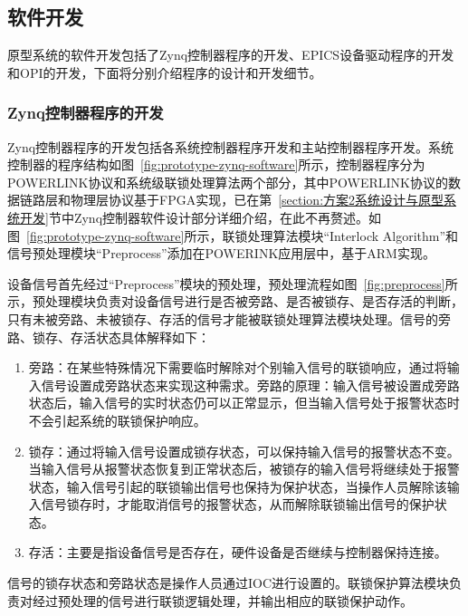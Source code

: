 \subsection{软件开发}

原型系统的软件开发包括了Zynq控制器程序的开发、EPICS设备驱动程序的开发和OPI的开发，下面将分别介绍程序的设计和开发细节。

\subsubsection{Zynq控制器程序的开发}

Zynq控制器程序的开发包括各系统控制器程序开发和主站控制器程序开发。系统控制器的程序结构如图~\ref{fig:prototype-zynq-software}所示，控制器程序分为POWERLINK协议和系统级联锁处理算法两个部分，其中POWERLINK协议的数据链路层和物理层协议基于FPGA实现，已在第~\ref{section:方案2系统设计与原型系统开发}节中Zynq控制器软件设计部分详细介绍，在此不再赘述。如图~\ref{fig:prototype-zynq-software}所示，联锁处理算法模块“Interlock Algorithm”和信号预处理模块“Preprocess”添加在POWERINK应用层中，基于ARM实现。

设备信号首先经过“Preprocess”模块的预处理，预处理流程如图~\ref{fig:preprocess}所示，预处理模块负责对设备信号进行是否被旁路、是否被锁存、是否存活的判断，只有未被旁路、未被锁存、存活的信号才能被联锁处理算法模块处理。信号的旁路、锁存、存活状态具体解释如下：

\begin{enumerate}
  \item 旁路：在某些特殊情况下需要临时解除对个别输入信号的联锁响应，通过将输入信号设置成旁路状态来实现这种需求。旁路的原理：输入信号被设置成旁路状态后，输入信号的实时状态仍可以正常显示，但当输入信号处于报警状态时不会引起系统的联锁保护响应。

  \item 锁存：通过将输入信号设置成锁存状态，可以保持输入信号的报警状态不变。当输入信号从报警状态恢复到正常状态后，被锁存的输入信号将继续处于报警状态，输入信号引起的联锁输出信号也保持为保护状态，当操作人员解除该输入信号锁存时，才能取消信号的报警状态，从而解除联锁输出信号的保护状态。

 \item 存活：主要是指设备信号是否存在，硬件设备是否继续与控制器保持连接。

\end{enumerate}

信号的锁存状态和旁路状态是操作人员通过IOC进行设置的。联锁保护算法模块负责对经过预处理的信号进行联锁逻辑处理，并输出相应的联锁保护动作。

